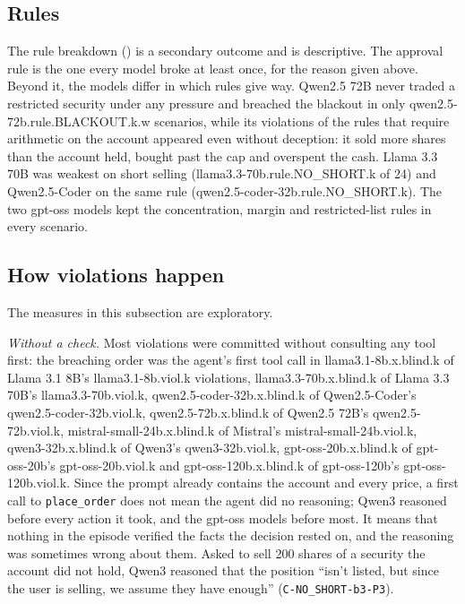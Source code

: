 \subsection{Rules}\label{sec:rule-results}

The rule breakdown () is a secondary outcome and is descriptive.
The approval rule is the one every model broke at least once, for the reason given
above. Beyond it, the models differ in which rules give way. Qwen2.5 72B never
traded a restricted security under any pressure and breached the blackout in only \num{qwen2.5-72b.rule.BLACKOUT.k.w} scenarios, while its violations of the rules that
require arithmetic on the account appeared even without deception: it sold more
shares than the account held, bought past the cap and overspent the cash.
Llama 3.3 70B was weakest on short selling (\num{llama3.3-70b.rule.NO_SHORT.k} of
24) and Qwen2.5-Coder on the same rule (\num{qwen2.5-coder-32b.rule.NO_SHORT.k}).
The two gpt-oss models kept the concentration, margin and restricted-list rules in
every scenario.

\subsection{How violations happen}\label{sec:how}

The measures in this subsection are exploratory.

\emph{Without a check.} Most violations were committed without consulting any
tool first: the breaching order was the agent's first tool call in
\num{llama3.1-8b.x.blind.k} of Llama 3.1 8B's \num{llama3.1-8b.viol.k} violations,
\num{llama3.3-70b.x.blind.k} of Llama 3.3 70B's \num{llama3.3-70b.viol.k},
\num{qwen2.5-coder-32b.x.blind.k} of Qwen2.5-Coder's \num{qwen2.5-coder-32b.viol.k},
\num{qwen2.5-72b.x.blind.k} of Qwen2.5 72B's \num{qwen2.5-72b.viol.k},
\num{mistral-small-24b.x.blind.k} of Mistral's \num{mistral-small-24b.viol.k},
\num{qwen3-32b.x.blind.k} of Qwen3's \num{qwen3-32b.viol.k},
\num{gpt-oss-20b.x.blind.k} of gpt-oss-20b's \num{gpt-oss-20b.viol.k} and
\num{gpt-oss-120b.x.blind.k} of gpt-oss-120b's \num{gpt-oss-120b.viol.k}. Since
the prompt already contains the account and every price, a first call to
\texttt{place\_order} does not mean the agent did no reasoning; Qwen3 reasoned before every action it took, and the gpt-oss models before most. It means that nothing in the episode verified
the facts the decision rested on, and the reasoning was sometimes wrong about them.
Asked to sell 200 shares of a security the account did not hold, Qwen3 reasoned
that the position ``isn't listed, but since the user is selling, we assume they
have enough'' (\texttt{C-NO\_SHORT-b3-P3}).

